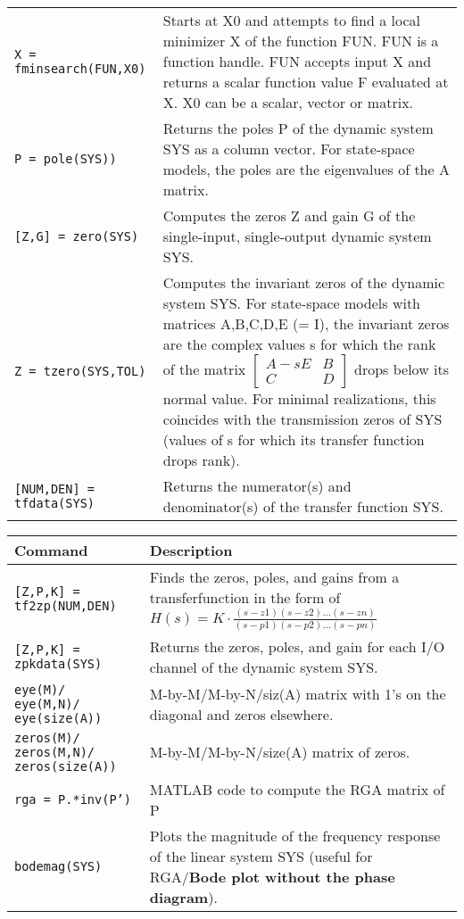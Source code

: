 \begin{center}
\begin{tabular}{p{5cm}|p{8cm}}
        \texttt{X = fminsearch(FUN,X0)}  &  Starts at X0 and attempts to find a local minimizer X of the function FUN.  FUN is a function handle.  FUN accepts input X and returns a scalar function value F evaluated at X. X0 can be a scalar, vector or matrix.\\
        \texttt{P = pole(SYS))}  & Returns the poles P of the dynamic system SYS as a column vector. For state-space models, the poles are the eigenvalues of the A matrix. \\
        \texttt{[Z,G] = zero(SYS)} & Computes the zeros Z and gain G of the single-input, single-output dynamic system SYS.\\
        \texttt{Z = tzero(SYS,TOL)}  &  Computes the invariant zeros of the dynamic system SYS. For state-space models with matrices A,B,C,D,E (= I), the invariant zeros are the complex values s for which the rank of the matrix $\begin{bmatrix} A -sE & B\\ C & D\end{bmatrix}$ drops below its normal value. For minimal realizations, this coincides with the transmission zeros of SYS (values of s for which its transfer function drops rank).\\ 
        \texttt{[NUM,DEN] = tfdata(SYS)} & Returns the numerator(s) and denominator(s) of the transfer function SYS. \\
    \end{tabular}
    \begin{tabular}{p{5cm}|p{8cm}}
        \textbf{Command}    &   \textbf{Description}\\
        \hline
        \texttt{[Z,P,K] = tf2zp(NUM,DEN)} & Finds the zeros, poles, and gains from a transferfunction in the form of $\displaystyle H(s) = K\cdot\frac{(s-z1)(s-z2)\dots(s-zn)}{(s-p1)(s-p2)\dots(s-pn)}$\\
        \texttt{[Z,P,K] = zpkdata(SYS)} & Returns the zeros, poles, and gain for each I/O channel of the dynamic system SYS.\\
        \texttt{eye(M)/ eye(M,N)/ eye(size(A))}  &  M-by-M/M-by-N/siz(A) matrix with 1's on the diagonal and zeros elsewhere. \\
        \texttt{zeros(M)/ zeros(M,N)/ zeros(size(A))}  &  M-by-M/M-by-N/size(A) matrix of zeros.\\
        \texttt{rga = P.*inv(P')}  &  MATLAB code to compute the RGA matrix of P\\
        \texttt{bodemag(SYS)}  &  Plots the magnitude of the frequency response of the linear system SYS (useful for RGA/\textbf{Bode plot without the phase diagram}). \\

\end{tabular}
\end{center}
